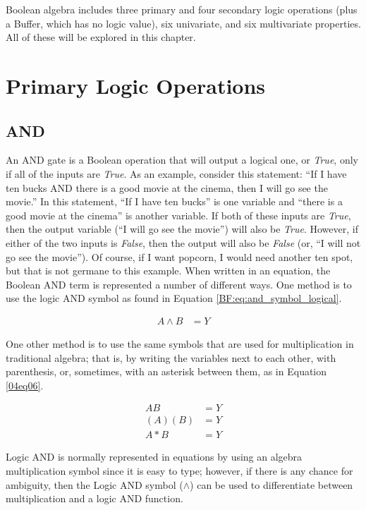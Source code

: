 Boolean algebra includes three primary and four secondary logic operations (plus a Buffer, which has no logic value), six univariate, and six multivariate properties. All of these will be explored in this chapter.

\section{Primary Logic Operations}\label{0401}
\subsection{AND}

An \textsf{AND}  gate is a Boolean operation that will output a logical one, or \emph{True}, only if all of the inputs are \emph{True}. As an example, consider this statement: ``If I have ten bucks AND there is a good movie at the cinema, then I will go see the movie.'' In this statement, ``If I have ten bucks'' is one variable and ``there is a good movie at the cinema'' is another variable. If both of these inputs are \emph{True}, then the output variable (``I will go see the movie'') will also be \emph{True}. However, if either of the two inputs is \emph{False}, then the output will also be \emph{False} (or, ``I will not go see the movie''). Of course, if I want popcorn, I would need another ten spot, but that is not germane to this example. When written in an equation, the Boolean \textsf{AND}  term is represented a number of different ways. One method is to use the logic \textsf{AND} symbol as found in Equation \ref{BF:eq:and_symbol_logical}.

\begin{align}
  \label{04eq05}
  A \wedge B &= Y 
\end{align}

One other method is to use the same symbols that are used for multiplication in traditional algebra; that is, by writing the variables next to each other, with parenthesis, or, sometimes, with an asterisk between them, as in Equation \ref{04eq06}.

\begin{align}
  \label{04eq06}
  AB &= Y \\
  \nonumber
  (A)(B) &= Y \\
  \nonumber
  A * B &= Y
\end{align}

 Logic \textsf{AND} is normally represented in equations by using an algebra multiplication symbol since it is easy to type; however, if there is any chance for ambiguity, then the Logic \textsf{AND}  symbol ($ \wedge $) can be used to differentiate between multiplication and a logic \textsf{AND}  function.

